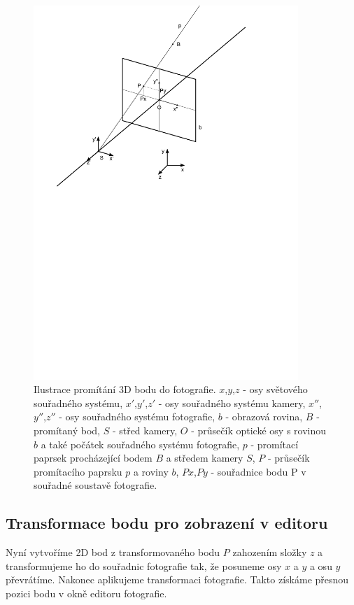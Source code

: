 \documentclass[11pt,twoside,a4paper]{book}
\begin{document}
 
\begin{figure}[]
	\begin{center}
		\includegraphics[width=10cm]{ilustrace/Il-6-1}
		\caption{Ilustrace promítání 3D bodu do fotografie. $x$,$y$,$z$ - osy světového souřadného systému, $x'$,$y'$,$z'$ - osy souřadného systému kamery, $x''$,$y''$,$z''$ - osy souřadného systému fotografie, $b$ - obrazová rovina, $B$ - promítaný bod, $S$ - střed kamery, $O$ - průsečík optické osy s rovinou $b$ a také počátek souřadného systému fotografie, $p$ - promítací paprsek procházející bodem $B$ a středem kamery $S$, $P$ - průsečík promítacího paprsku $p$ a roviny $b$, $Px$,$Py$ - souřadnice bodu P v souřadné soustavě fotografie.}
		\label{fig:6-1}
	\end{center}
\end{figure}

\clearpage

\subsection{Transformace bodu pro zobrazení v editoru}
Nyní vytvoříme 2D bod z transformovaného bodu $P$ zahozením složky $z$ a transformujeme ho do souřadnic fotografie tak, že posuneme osy $x$ a $y$ a osu $y$ převrátíme. Nakonec aplikujeme transformaci fotografie. Takto získáme přesnou pozici bodu v okně editoru fotografie.
\end{document}
